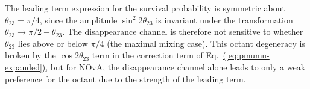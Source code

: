 

The leading term expression for the survival probability is symmetric about $\theta_{23} = \pi/4$, since the amplitude $\sin^{2}2\theta_{23}$ is invariant under the transformation $\theta_{23}\rightarrow \pi/2 - \theta_{23}$. The disappearance channel is therefore not sensitive to whether $\theta_{23}$ lies above or below $\pi/4$ (the maximal mixing case). This octant degeneracy is broken by the $\cos 2\theta_{23}$ term in the correction term of Eq.~\hyperref[eq:pmumu-expanded]{(\ref{eq:pmumu-expanded})}, but for NOvA, the disappearance channel alone leads to only a weak preference for the octant due to the strength of the leading term.

